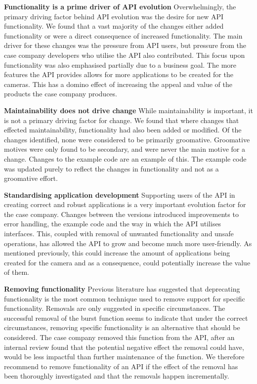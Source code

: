 \documentclass{sig-alternate}
\begin{document}
\noindent
\textbf{Functionality is a prime driver of API evolution  }  %
Overwhelmingly, the primary driving factor behind API evolution was the desire for new API functionality. We found that a vast majority of the changes either added functionality or were a direct consequence of increased functionality. The main driver for these changes was the pressure from API users, but pressure from the case company developers who utilise the API also contributed. This focus upon functionality was also emphasised partially due to a business goal. The more features the API provides allows for more applications to be created for the cameras. This has a domino effect of increasing the appeal and value of the products the case company produces.

\smallskip \noindent 
\textbf{Maintainability does not drive change  }  %
While maintainability is important, it is not a primary driving factor for change. We found that where changes that effected maintainability, functionality had also been added or modified. Of the changes identified, none were considered to be primarily groomative. Groomative motives were only found to be secondary, and were never the main motive for a change. Changes to the example code are an example of this. The example code was updated purely to reflect the changes in functionality and not as a groomative effort. 

\smallskip \noindent
\textbf{Standardising application development  } %
Supporting users of the API in creating correct and robust applications is a very important evolution factor for the case company. Changes between the versions introduced improvements to error handling, the example code and the way in which the API utilises interfaces. This, coupled with removal of unwanted functionality and unsafe operations, has allowed the API to grow and become much more user-friendly. As mentioned previously, this could increase the amount of applications being created for the camera and as a consequence, could potentially increase the value of them.

\smallskip \noindent
\textbf{Removing functionality  } %
Previous literature has suggested that deprecating functionality is the most common technique used to remove support for specific functionality. Removals are only suggested in specific circumstances. The successful removal of the burst function seems to indicate that under the correct circumstances, removing specific functionality is an alternative that should be considered. The case company removed this function from the API, after an internal review found that the potential negative effect the removal could have, would be less impactful than further maintenance of the function. We therefore recommend to remove functionality of an API if the effect of the removal has been thoroughly investigated and that the removals happen incrementally.
\end{document}
